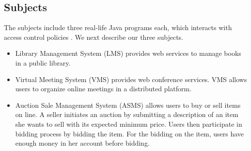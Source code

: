 







\subsection{Subjects}
The subjects include three real-life Java programs each, which
interacts with access control policies \cite{mouelhi09:tranforming}. We next describe
our three subjects.
\begin{itemize}	
\item Library Management System (LMS) provides web services to manage books in a public library.
\item Virtual Meeting System (VMS) provides web conference services. VMS allows users to organize
online meetings in a distributed platform.
\item Auction Sale Management System (ASMS) allows users to buy or sell items on line. A seller initiates an auction by submitting a description of an item she wants to sell with its expected minimum price. Users then participate in bidding process by
bidding the item. For the bidding on the item, users have enough money in her account before bidding.
\end{itemize}

